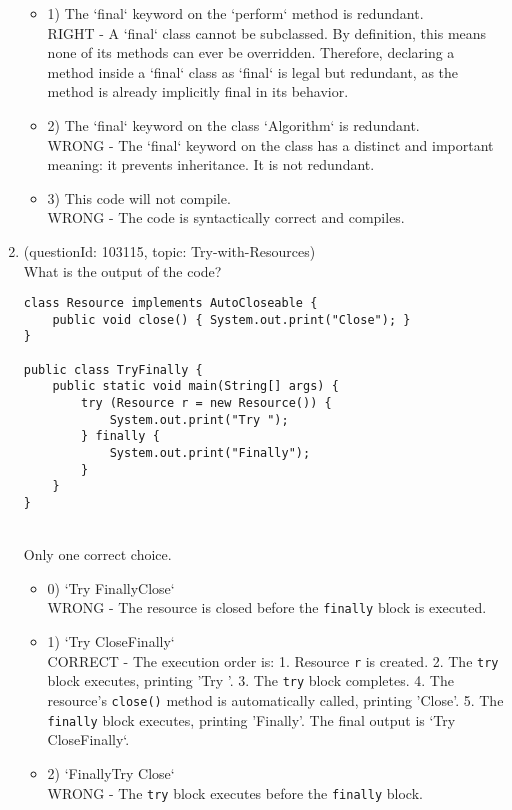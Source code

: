 \documentclass[12pt]{article}
\begin{document}
\begin{enumerate}[label=(\arabic*)]
\begin{itemize}
\item 1) The `final` keyword on the `perform` method is redundant.
 \\ 
RIGHT - A `final` class cannot be subclassed. By definition, this means none of its methods can ever be overridden. Therefore, declaring a method inside a `final` class as `final` is legal but redundant, as the method is already implicitly final in its behavior.

\item 2) The `final` keyword on the class `Algorithm` is redundant.
 \\ 
WRONG - The `final` keyword on the class has a distinct and important meaning: it prevents inheritance. It is not redundant.

\item 3) This code will not compile.
 \\ 
WRONG - The code is syntactically correct and compiles.

\end{itemize}
\item (questionId: 103115, topic: Try-with-Resources) \\ 
What is the output of the code?
\begin{verbatim}
class Resource implements AutoCloseable {
    public void close() { System.out.print("Close"); }
}

public class TryFinally {
    public static void main(String[] args) {
        try (Resource r = new Resource()) {
            System.out.print("Try ");
        } finally {
            System.out.print("Finally");
        }
    }
}
\end{verbatim}
\\ \noindent Only one correct choice. 
\begin{itemize}
\item 0) `Try FinallyClose`
 \\ 
WRONG - The resource is closed before the \verb|finally| block is executed.

\item 1) `Try CloseFinally`
 \\ 
CORRECT - The execution order is: 1. Resource \verb|r| is created. 2. The \verb|try| block executes, printing 'Try '. 3. The \verb|try| block completes. 4. The resource's \verb|close()| method is automatically called, printing 'Close'. 5. The \verb|finally| block executes, printing 'Finally'. The final output is `Try CloseFinally`.

\item 2) `FinallyTry Close`
 \\ 
WRONG - The \verb|try| block executes before the \verb|finally| block.


\end{itemize}
\end{enumerate}
\end{document}
